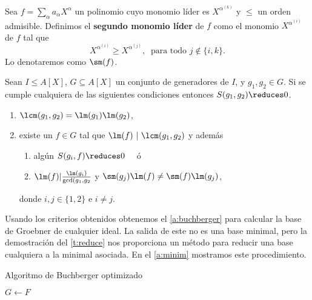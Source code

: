 \begin{definicion}
    Sea $f= \sum_{\alpha} a_{\alpha} X^{\alpha}$ un polinomio cuyo monomio líder es $X^{\alpha^{(k)}}$ y $\le$ un orden admisible. Definimos el \textbf{segundo monomio líder} de $f$ como el monomio $X^{\alpha^{(i)}}$ de $f$ tal que
    \begin{equation*}
        X^{\alpha^{(i)}} \ge X^{\alpha^{(j)}},\ \text{ para todo } j\notin\{i,k\}. 
    \end{equation*}
    Lo denotaremos como $\sm(f)$.
\end{definicion}
\begin{teorema}\label{t:criterios}
    Sean $I\le A[X]$, $G\subseteq A[X]$ un conjunto de generadores de $I$, y $g_1,g_2 \in G$. Si se cumple cualquiera de las siguientes condiciones entonces  $S(g_1,g_2)\reduces 0$.
    \begin{enumerate}
        \item $\lcm(g_1,g_2) = \lm(g_1)\lm(g_2)$,
        \item existe un $f\in G$ tal que $\lm(f)\ \vert\ \lcm(g_1,g_2)$ y además
        \begin{enumerate}
            \item algún $S(g_i,f)\reduces 0\quad$ ó
            \item $\lm(f)\vert \frac{\lm(g_i)}{\gcd(g_1,g_2}$ y $\sm(g_j)\lm(f) \neq \sm(f)\lm(g_j)$,
        \end{enumerate}
        donde $i,j\in\{1,2\}$ e $i\neq j$.
    \end{enumerate}
    
\end{teorema}

Usando los criterios obtenidos obtenemos el \autoref{a:buchberger} para calcular la base de Groebner de cualquier ideal. La salida de este no es una base minimal, pero la demostración del \autoref{t:reduce} nos proporciona un método para reducir una base cualquiera a la minimal asociada. En el \autoref{a:minim} mostramos este procedimiento.\newline

\begin{algorithm}[hbt!]
    \caption{Algoritmo de Buchberger optimizado}\label{a:buchberger}

    $G\gets F$\;


\end{algorithm}

